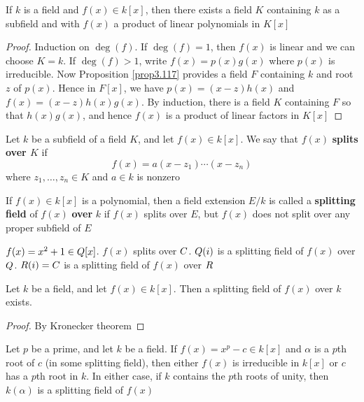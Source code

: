 \documentclass[11pt]{article}
\begin{document}
\begin{theorem}[Kronecker]
If \(k\) is a field and \(f(x)\in k[x]\), then there exists a field \(K\)
containing \(k\) as a subfield and with \(f(x)\) a product of linear
polynomials in \(K[x]\)
\end{theorem}

\begin{proof}
Induction on \(\deg(f)\). If \(\deg(f)=1\), then \(f(x)\) is linear and we can
choose \(K=k\). If \(\deg(f)>1\), write \(f(x)=p(x)g(x)\) where \(p(x)\) is
irreducible. Now Proposition \ref{prop3.117} provides a field \(F\) containing
\(k\) and root \(z\) of \(p(x)\). Hence in \(F[x]\), we have \(p(x)=(x-z)h(x)\)
and \(f(x)=(x-z)h(x)g(x)\). By induction, there is a field \(K\) containing \(F\)
so that \(h(x)g(x)\), and hence \(f(x)\) is a product of linear factors in \(K[x]\)
\end{proof}

\begin{definition}[]
Let \(k\) be a subfield of a field \(K\), and let \(f(x)\in k[x]\). We say that
\(f(x)\) \textbf{splits over \(K\)} if
\begin{equation*}
f(x)=a(x-z_1)\cdots(x-z_n)
\end{equation*}
where \(z_1,\dots,z_n\in K\) and \(a\in k\) is nonzero

If \(f(x)\in k[x]\) is a polynomial, then a field extension \(E/k\) is called
a \textbf{splitting field} of \(f(x)\) \textbf{over} \(k\) if \(f(x)\) splits over \(E\), but
\(f(x)\) does not split over any proper subfield of \(E\)
\end{definition}

\(f(x)=x^2+1\in\relax{Q}[x]\). \(f(x)\) splits over \(\relax{C}\). \(\relax{Q}(i)\) is a splitting
field of \(f(x)\) over \(\relax{Q}\). \(\relax{R}(i)=\relax{C}\) is a splitting field of \(f(x)\)
over \(\relax{R}\) 


\begin{corollary}[]
Let \(k\) be a field, and let \(f(x)\in k[x]\). Then a splitting field of
\(f(x)\) over \(k\) exists.
\end{corollary}

\begin{proof}
By Kronecker theorem
\end{proof}

\begin{proposition}[]
\label{prop3.126}
Let \(p\) be a prime, and let \(k\) be a field. If \(f(x)=x^p-c\in k[x]\) and
\(\alpha\) is a \(p\)th root of \(c\) (in some splitting field), then either \(f(x)\) is
irreducible in \(k[x]\) or \(c\) has a \(p\)th root in \(k\). In either case, if
\(k\) contains the \(p\)th roots of unity, then \(k(\alpha)\) is a splitting field
of \(f(x)\)
\end{proposition}
\end{document}
